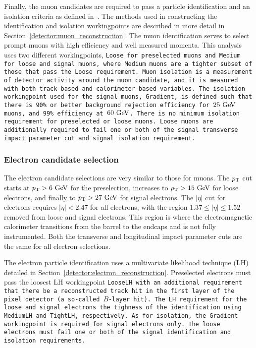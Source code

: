 Finally, the muon candidates are required to pass a particle identification and an isolation criteria as defined in~\cite{2016.muon-reconstruction-13tev}.
The methods used in constructing the identification and isolation workingpoints are described in more detail in Section~\ref{detector:muon_reconstruction}.
The muon identification serves to select prompt muons with high efficiency and well measured momenta.%
This analysis uses two different workingpoints, \tt{Loose} for preselected muons and \tt{Medium} for loose and signal muons, where \tt{Medium} muons are a tighter subset of those that pass the \tt{Loose} requirement.
Muon isolation is a measurement of detector activity around the muon candidate, and it is measured with both track-based and calorimeter-based variables.
The isolation workingpoint used for the signal muons, \tt{Gradient}, is defined such that there is 90\% or better background rejection efficiency for $25\gev$ muons, and 99\% efficiency at $60\gev$.
There is no minimum isolation requirement for preselected or loose muons.
Loose muons are additionally required to fail one or both of the signal transverse impact parameter cut and signal isolation requirement.



\subsubsection{Electron candidate selection}
The electron candidate selections are very similar to those for muons.
The $p_{\mathrm{T}}$ cut starts at $\pt > 6\gev$ for the preselection, increases to $\pt > 15\gev$ for loose electrons, and finally to $\pt > 27\gev$ for signal electrons.
The $|\eta|$ cut for electrons requires $|\eta| < 2.47$ for all electrons, with the region $1.37 \le |\eta| \le 1.52$ removed from loose and signal electrons.
This region is where the electromagnetic calorimeter transitions from the barrel to the endcaps and is not fully instrumented.
Both the transverse and longitudinal impact parameter cuts are the same for all electron selections.

The electron particle identification uses a multivariate likelihood technique (LH)~\cite{2016.electron-performance-13tev} detailed in Section~\ref{detector:electron_reconstruction}.
Preselected electrons must pass the loosest LH workingpoint \tt{LooseLH} with an additional requirement that there be a reconstructed track hit in the first layer of the pixel detector (a so-called $B$-layer hit).
The LH requirement for the loose and signal electrons the tighness of the identification using \tt{MediumLH} and \tt{TightLH}, respectively.
As for isolation, the \tt{Gradient} workingpoint is required for signal electrons only.
The loose electrons must fail one or both of the signal identification and isolation requirements.

